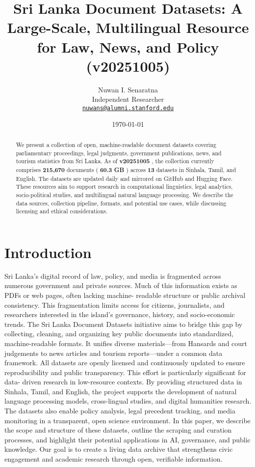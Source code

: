 \documentclass[10pt,a4paper]{article}%
\title{Sri Lanka Document Datasets: A Large{-}Scale, Multilingual Resource for Law, News, and Policy (v20251005)}%
\author{Nuwan I. Senaratna\\Independent Researcher\\\vspace{0.25em}\texttt{\href{mailto:nuwans@alumni.stanford.edu}{nuwans@alumni.stanford.edu}}}%
\date{\today}%
\begin{document}
%
\normalsize%
\maketitle%
\begin{abstract}%
We present a collection of open, machine-readable document datasets covering parliamentary proceedings, legal judgments, government publications, news, and tourism statistics from Sri Lanka. As of \textbf{v20251005} , the collection currently comprises \textbf{215,670}  documents ( \textbf{60.3 GB} ) across \textbf{13}  datasets in Sinhala, Tamil, and English. The datasets are updated daily and mirrored on GitHub and Hugging Face. These resources aim to support research in computational linguistics, legal analytics, socio-political studies, and multilingual natural language processing. We describe the data sources, collection pipeline, formats, and potential use cases, while discussing licensing and ethical considerations.%
\newline%
\newline%
\end{abstract}%
\section{Introduction}%
\label{sec:Introduction}%
Sri Lanka’s digital record of law, policy, and media is fragmented across numerous government and private sources. Much of this information exists as PDFs or web pages, often lacking machine- readable structure or public archival consistency. This fragmentation limits access for citizens, journalists, and researchers interested in the island’s governance, history, and socio-economic trends.%
\newline%
\newline%
The Sri Lanka Document Datasets initiative aims to bridge this gap by collecting, cleaning, and organizing key public documents into standardized, machine-readable formats. It unifies diverse materials—from Hansards and court judgements to news articles and tourism reports—under a common data framework. All datasets are openly licensed and continuously updated to ensure reproducibility and public transparency.%
\newline%
\newline%
This effort is particularly significant for data- driven research in low-resource contexts. By providing structured data in Sinhala, Tamil, and English, the project supports the development of natural language processing models, cross-lingual studies, and digital humanities research. The datasets also enable policy analysis, legal precedent tracking, and media monitoring in a transparent, open science environment.%
\newline%
\newline%
In this paper, we describe the scope and structure of these datasets, outline the scraping and curation processes, and highlight their potential applications in AI, governance, and public knowledge. Our goal is to create a living data archive that strengthens civic engagement and academic research through open, verifiable information.%
\newline%
\newline
\end{document}
